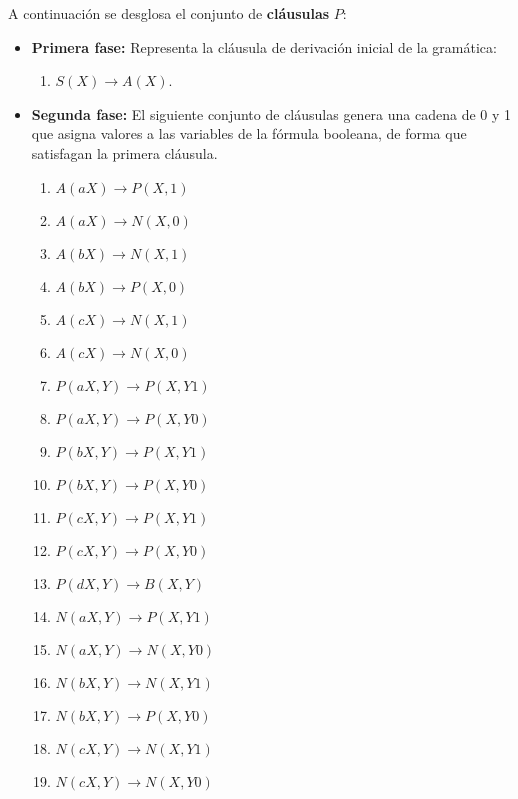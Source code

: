 \documentclass[12pt]{article}
\begin{document}
A continuación se desglosa el conjunto de \textbf{cláusulas} $P$:

\begin{itemize}
    \item \textbf{Primera fase:} Representa la cláusula de derivación inicial de la gramática:
          \begin{enumerate}
              \item $S(X)\to A(X)$.
          \end{enumerate}
          
    \item \textbf{Segunda fase:} El siguiente conjunto de cláusulas genera una cadena de 0 y 1 que asigna valores a las
          variables de la fórmula booleana, de forma que satisfagan la primera cláusula.
          \begin{multicols}{2}
              \begin{enumerate}[start=2]
                  \item $A(aX)\to P(X,1)$
                  \item $A(aX)\to N(X,0)$
                  \item $A(bX)\to N(X,1)$
                  \item $A(bX)\to P(X,0)$
                  \item $A(cX)\to N(X,1)$
                  \item $A(cX)\to N(X,0)$
                        
                  \item $P(aX,Y)\to P(X,Y1)$
                  \item $P(aX,Y)\to P(X,Y0)$
                  \item $P(bX,Y)\to P(X,Y1)$
                  \item $P(bX,Y)\to P(X,Y0)$
                  \item $P(cX,Y)\to P(X,Y1)$
                  \item $P(cX,Y)\to P(X,Y0)$
                  \item $P(dX,Y)\to B(X,Y)$
                        
                  \item $N(aX,Y)\to P(X,Y1)$
                  \item $N(aX,Y)\to N(X,Y0)$
                  \item $N(bX,Y)\to N(X,Y1)$
                  \item $N(bX,Y)\to P(X,Y0)$
                  \item $N(cX,Y)\to N(X,Y1)$
                  \item $N(cX,Y)\to N(X,Y0)$
              \end{enumerate}
          \end{multicols}
          

\end{itemize}
\end{document}
